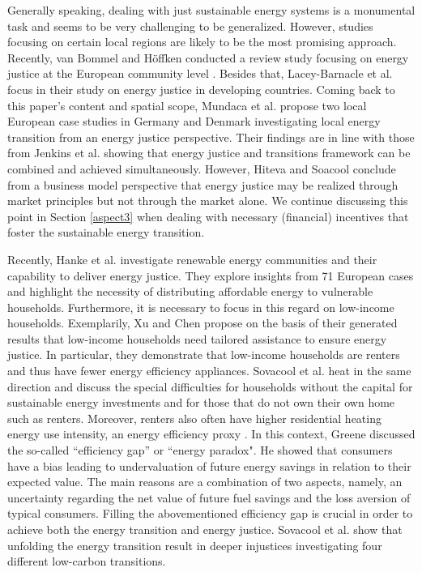 Generally speaking, dealing with just sustainable energy systems is a monumental task and seems to be very challenging to be generalized. However, studies focusing on certain local regions are likely to be the most promising approach. Recently, van Bommel and Höffken conducted a review study focusing on energy justice at the European community level \cite{van2021energy}. Besides that, Lacey-Barnacle et al. \cite{lacey2020energy} focus in their study on energy justice in developing countries. Coming back to this paper's content and spatial scope, Mundaca et al. \cite{mundaca2018successful} propose two local European case studies in Germany and Denmark investigating local energy transition from an energy justice perspective. Their findings are in line with those from Jenkins et al. \cite{jenkins2018humanizing} showing that energy justice and transitions framework can be combined and achieved simultaneously. However, Hiteva and Soacool \cite{hiteva2017harnessing} conclude from a business model perspective that energy justice may be realized through market principles but not through the market alone. We continue discussing this point in Section \ref{aspect3} when dealing with necessary (financial) incentives that foster the sustainable energy transition. \vspace{0.5cm} 

Recently, Hanke et al. \cite{hanke2021renewable} investigate renewable energy communities and their capability to deliver energy justice. They explore insights from 71 European cases and highlight the necessity of distributing affordable energy to vulnerable households. Furthermore, it is necessary to focus in this regard on low-income households. Exemplarily, Xu and Chen \cite{xu2019energy} propose on the basis of their generated results that low-income households need tailored assistance to ensure energy justice. In particular, they demonstrate that low-income households are renters and thus have fewer energy efficiency appliances. Sovacool et al. \cite{sovacool2019temporality} heat in the same direction and discuss the special difficulties for households without the capital for sustainable energy investments and for those that do not own their own home such as renters. Moreover, renters also often have higher residential heating energy use intensity, an energy efficiency proxy \cite{reames2016targeting}. In this context, Greene \cite{greene2011uncertainty} discussed the so-called “efficiency gap” or “energy paradox". He showed that consumers have a bias leading to undervaluation of future energy savings in relation to their expected value. The main reasons are a combination of two aspects, namely, an uncertainty regarding the net value of future fuel savings and the loss aversion of typical consumers. Filling the abovementioned efficiency gap is crucial in order to achieve both the energy transition and energy justice. Sovacool et al. \cite{sovacool2019decarbonization} show that unfolding the energy transition result in deeper injustices investigating four different low-carbon transitions.

